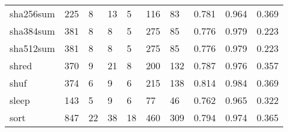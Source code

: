 \begin{longtable}{lp{2.0cm}p{2.0cm}p{2.0cm}p{2.0cm}p{2.0cm}p{2.0cm}p{2.0cm}p{2.0cm}p{2.0cm}}
sha256sum &                    225 &                                  8 &                                13 &                                5 &                               116 &                              83 &                                   0.781 &                                  0.964 &                                0.369 \\
sha384sum &                    381 &                                  8 &                                 8 &                                5 &                               275 &                              85 &                                   0.776 &                                  0.979 &                                0.223 \\
sha512sum &                    381 &                                  8 &                                 8 &                                5 &                               275 &                              85 &                                   0.776 &                                  0.979 &                                0.223 \\
shred     &                    370 &                                  9 &                                21 &                                8 &                               200 &                             132 &                                   0.787 &                                  0.976 &                                0.357 \\
shuf      &                    374 &                                  6 &                                 9 &                                6 &                               215 &                             138 &                                   0.814 &                                  0.984 &                                0.369 \\
sleep     &                    143 &                                  5 &                                 9 &                                6 &                                77 &                              46 &                                   0.762 &                                  0.965 &                                0.322 \\
sort      &                    847 &                                 22 &                                38 &                               18 &                               460 &                             309 &                                   0.794 &                                  0.974 &                                0.365 \\

\end{longtable}
